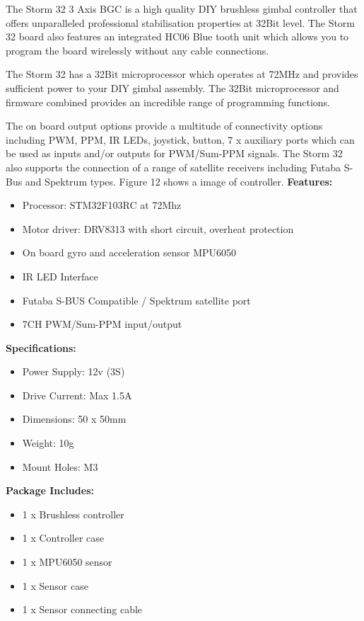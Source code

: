 \documentclass[11pt,a4paper]{article}
\begin{document}
\begin{enumerate}
			The Storm 32 3 Axis BGC is a high quality DIY brushless gimbal controller that offers unparalleled professional stabilisation properties at 32Bit level. The Storm 32 board also features an integrated HC06 Blue tooth unit which allows you to program the board wirelessly without any cable connections.
			
			The Storm 32 has a 32Bit microprocessor which operates at 72MHz and provides sufficient power to your DIY gimbal assembly. The 32Bit microprocessor and firmware combined provides an incredible range of programming functions.
			
			The on board output options provide a multitude of connectivity options including PWM, PPM, IR LEDs, joystick, button, 7 x auxiliary ports which can be used as inputs and/or outputs for PWM/Sum-PPM signals. The Storm 32 also supports the connection of a range of satellite receivers including Futaba S-Bus and Spektrum types. Figure 12 shows a image of controller.
			\textbf{Features:}
			\begin{itemize}
				\item Processor: STM32F103RC at 72Mhz
				\item Motor driver: DRV8313 with short circuit, overheat protection
				\item On board gyro and acceleration sensor MPU6050
				\item IR LED Interface
				\item Futaba S-BUS Compatible / Spektrum satellite port
				\item 7CH PWM/Sum-PPM input/output
			\end{itemize}
			\textbf{Specifications:}
			\begin{itemize}
				\item Power Supply: 12v (3S)
				\item Drive Current: Max 1.5A
				\item Dimensions: 50 x 50mm
				\item Weight: 10g
				\item Mount Holes: M3
			\end{itemize}
			\textbf{Package Includes:}
			\begin{itemize}
				\item 1 x Brushless controller
				\item 1 x Controller case
				\item 1 x MPU6050 sensor
				\item 1 x Sensor case
				\item 1 x Sensor connecting cable

\end{itemize}
\end{enumerate}
\end{document}
